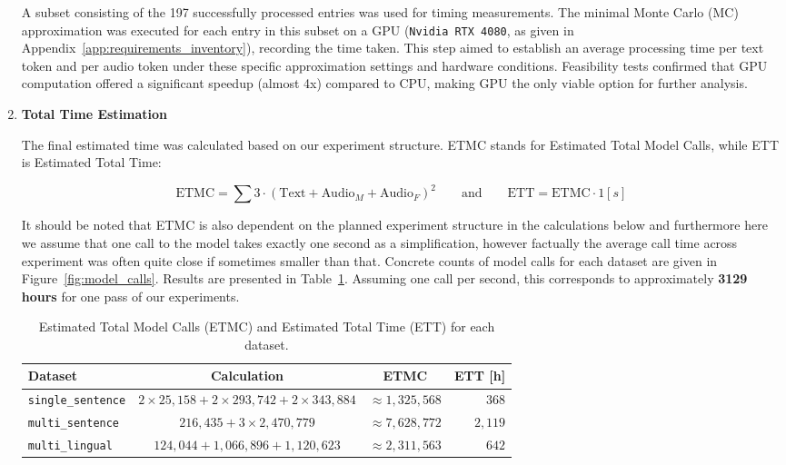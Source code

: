 \begin{appendices}
\begin{enumerate}[itemsep=4pt, topsep=4pt, left=10pt]
        A subset consisting of the 197 successfully processed entries was used for timing measurements. The minimal Monte Carlo (MC) approximation was executed for each entry in this subset on a GPU (\texttt{Nvidia RTX 4080}, as given in Appendix~\ref{app:requirements_inventory}), recording the time taken. This step aimed to establish an average processing time per text token and per audio token under these specific approximation settings and hardware conditions. Feasibility tests confirmed that GPU computation offered a significant speedup (almost 4x) compared to CPU, making GPU the only viable option for further analysis.

        \item \textbf{Total Time Estimation}

        The final estimated time was calculated based on our experiment structure. ETMC stands for Estimated Total Model Calls, while ETT is Estimated Total Time:

        \[
        \text{ETMC} = \sum 3 \cdot (\text{Text} + \text{Audio}_M + \text{Audio}_F)^2
        \qquad \text{and} \qquad
        \text{ETT} = \text{ETMC} \cdot 1[s]
        \]

        It should be noted that ETMC is also dependent on the planned experiment structure in the calculations below and furthermore here we assume that one call to the model takes exactly one second as a simplification, however factually the average call time across experiment was often quite close if sometimes smaller than that. Concrete counts of model calls for each dataset are given in Figure~\ref{fig:model_calls}. Results are presented in Table~\ref{tab:dataset_estimates}. Assuming one call per second, this corresponds to approximately \textbf{3129 hours} for one pass of our experiments.

        \begin{table}[h!]
            \centering
            \caption{Estimated Total Model Calls (ETMC) and Estimated Total Time (ETT) for each dataset.}
            \label{tab:dataset_estimates}
            \begin{tabular}{lccr}
                \toprule
                \textbf{Dataset} & \textbf{Calculation} & \textbf{ETMC} & \textbf{ETT [h]} \\
                \midrule
                \texttt{single\_sentence} & $2 \times 25,158 + 2 \times 293,742 + 2 \times 343,884$ & $\approx 1,325,568$ & $368$ \\
                \addlinespace
                \texttt{multi\_sentence} & $216,435 + 3 \times 2,470,779$ & $\approx 7,628,772$ & $2,119$ \\
                \addlinespace
                \texttt{multi\_lingual} & $124,044 + 1,066,896 + 1,120,623$ & $\approx 2,311,563$ & $642$ \\
                \bottomrule
            \end{tabular}
        \end{table}


\end{enumerate}
\end{appendices}
